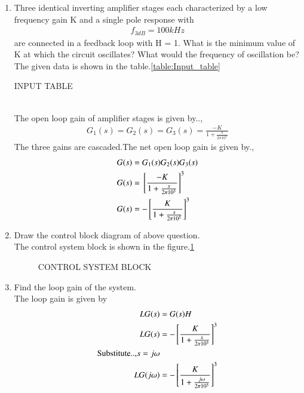 \begin{enumerate}[label=\thesubsection.\arabic*.,ref=\thesubsection.\theenumi]

\item Three identical inverting amplifier stages each characterized by a low frequency gain K and a single pole response with 
\begin{align}
    f_{3dB} = 100kHz
\end{align}
are connected in a feedback loop with H = 1.
What is the minimum value of K at which the circuit oscillates? What would the frequency of oscillation be?\\
\solution
The given data is shown in the table.\ref{table:Input_table}
\begin{table}[!ht]
\centering

\caption{INPUT TABLE}
\label{table:Input_table}
\end{table}
\\
The open loop gain of amplifier stages is given by..,
\begin{align}
    G_1(s) = G_2(s) = G_3(s) = \frac{-K}{1+\frac{s}{2\pi10^5}}
\end{align}
The three gains are cascaded.The net open loop gain is given by.,
\begin{align}
    G(s) &= G_1(s)G_2(s)G_3(s)\\
    G(s) &= {}\left[\frac{-K}{1+\frac{s}{2\pi10^5}}\right]^3\\
    G(s) &= -{}\left[\frac{K}{1+\frac{s}{2\pi10^5}}\right]^3
\end{align}
\item Draw the control block diagram of above question.\\
\solution 
The control system block is shown in the figure.\ref{fig:control_system}
\begin{figure}[!hbt]
	\begin{center}
			\resizebox{\columnwidth}{!}{}
	\end{center}
\caption{CONTROL SYSTEM BLOCK}
\label{fig:control_system}
\end{figure}
\item Find the loop gain of the system.\\
\solution The loop gain is given by 
\begin{align}
    LG(s) &= G(s)H \\
    LG(s) &= -\sbrak{\frac{K}{1+\frac{s}{2\pi10^5}}}^3\\
\text{Substitute..,} s=j\omega \\
LG(j\omega) &= -\sbrak{\frac{K}{1+\frac{j\omega}{2\pi10^5}}}^3 \label{eq:ee18btech11031_Transfer_Func}
\end{align}


\end{enumerate}
